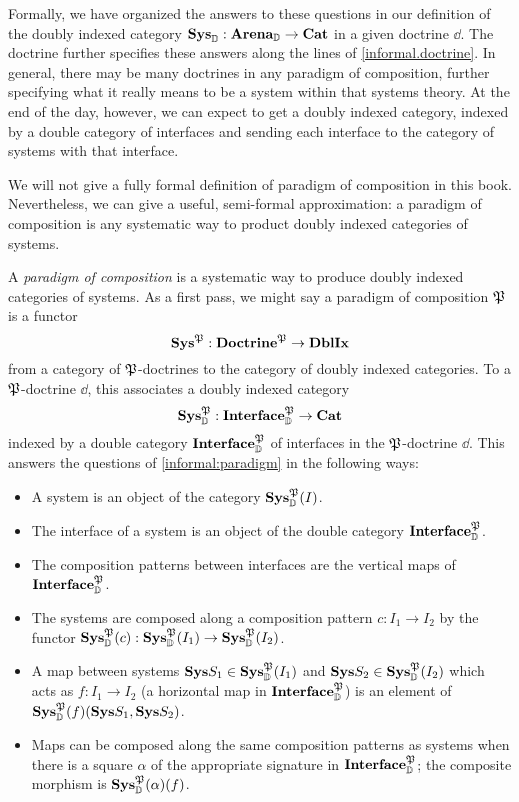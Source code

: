 \documentclass[DynamicalBook]{subfiles}
\begin{document}
Formally, we have organized the answers to these questions in our definition of the doubly indexed category $\textbf{Sys}_{\mathbb{D}} : \textbf{Arena}_{{\mathbb{D}}} \to \textbf{Cat}$ in a given doctrine $\dd$. The doctrine further specifies these answers along the lines of \cref{informal.doctrine}. In general, there may be many doctrines in any paradigm of composition, further specifying what it really means to be a system within that systems theory. At the end of the day, however, we can expect to get a doubly indexed category, indexed by a double category of interfaces and sending each interface to the category of systems with that interface.

We will not give a fully formal definition of paradigm of composition in this book. Nevertheless, we can give a useful, semi-formal approximation: a paradigm of composition is any systematic way to product doubly indexed categories of systems.
\begin{semiformal}
  A \emph{paradigm of composition} is a systematic way to produce doubly indexed categories of systems. As a first pass, we might say a paradigm of composition $\mathfrak{P}$ is a functor
  $$\textbf{Sys}^{\mathfrak{P}} : \textbf{Doctrine}^{\mathfrak{P}} \to \textbf{DblIx}$$
  from a category of $\mathfrak{P}$-doctrines to the category of doubly indexed categories. To a $\mathfrak{P}$-doctrine $\dd$, this associates a doubly indexed category
  $$\textbf{Sys}^{\mathfrak{P}}_{{\mathbb{D}}} : \textbf{Interface}^{{\mathfrak{P}}}_{{\mathbb{D}}} \to \textbf{Cat}$$
  indexed by a double category $\textbf{Interface}^{{\mathfrak{P}}}_{{\mathbb{D}}}$ of interfaces in the $\mathfrak{P}$-doctrine $\dd$. This answers the questions of \cref{informal:paradigm} in the following ways:
  \begin{itemize}
          \item A system is an object of the category $\textbf{Sys}^{\mathfrak{P}}_{\mathbb{D}}(I)$.
          \item The interface of a system is an object of the double category $\textbf{Interface}^{{\mathfrak{P}}}_{\mathbb{D}}$.
          \item The composition patterns between interfaces are the vertical maps of $\textbf{Interface}^{{\mathfrak{P}}}_{\mathbb{D}}$.
          \item The systems are composed along a composition pattern $c : I_{1} \to I_{2}$ by the functor $\textbf{Sys}^{{\mathfrak{P}}}_{\mathbb{D}}(c) : \textbf{Sys}^{{\mathfrak{P}}}_{\mathbb{D}}(I_{1}) \to \textbf{Sys}^{{\mathfrak{P}}}_{\mathbb{D}}(I_{2})$.
          \item A map between systems $\textbf{Sys}{S}_{1} \in \textbf{Sys}^{{\mathfrak{P}}}_{\mathbb{D}}(I_{1})$ and $\textbf{Sys}{S}_{2} \in \textbf{Sys}^{{\mathfrak{P}}}_{\mathbb{D}}(I_{2})$ which acts as $f : I_{1} \to I_{2}$ (a horizontal map in $\textbf{Interface}^{{\mathfrak{P}}}_{{\mathbb{D}}}$) is an element of $\textbf{Sys}^{{\mathfrak{P}}}_{\mathbb{D}}(f)(\textbf{Sys}{S}_{1}, \textbf{Sys}{S}_{2})$.
          \item Maps can be composed along the same composition patterns as systems when there is a square  $\alpha$ of the appropriate signature in $\textbf{Interface}^{{\mathfrak{P}}}_{\mathbb{D}}$; the composite morphism is $\textbf{Sys}^{{\mathfrak{P}}}_{\mathbb{D}}(\alpha)(f)$.
  \end{itemize}
  \end{semiformal}
\end{document}
